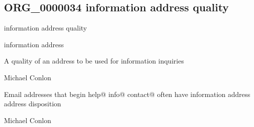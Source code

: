 \documentclass[letterpaper,10pt,english]{sphinxmanual}
\begin{document}
\subsection{ORG\_0000034 \sphinxhyphen{} information address quality}
\label{\detokenize{doc-ORG_0000034:org-0000034-information-address-quality}}\label{\detokenize{doc-ORG_0000034:index-0}}\label{\detokenize{doc-ORG_0000034::doc}}
\begin{sphinxShadowBox}

\sphinxAtStartPar
information address quality
\end{sphinxShadowBox}

\begin{sphinxShadowBox}

\sphinxAtStartPar
information address
\end{sphinxShadowBox}

\begin{sphinxShadowBox}

\sphinxAtStartPar
{\hyperref[\detokenize{doc-BFO_0000019::doc}]{}}
\end{sphinxShadowBox}

\begin{sphinxShadowBox}

\sphinxAtStartPar
A quality of an address to be used for information inquiries
\end{sphinxShadowBox}

\begin{sphinxShadowBox}

\sphinxAtStartPar
Michael Conlon 
\end{sphinxShadowBox}

\begin{sphinxShadowBox}

\sphinxAtStartPar
Email addresses that begin help@ info@ contact@ often have information address address disposition
\end{sphinxShadowBox}

\begin{sphinxShadowBox}

\sphinxAtStartPar
Michael Conlon 
\end{sphinxShadowBox}
\begin{quote}

\ignorespaces \end{quote}
\end{document}
